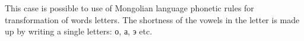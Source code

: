 \documentclass[conference,a4paper]{IEEEtran}
\begin{document}
This case is possible to use of Mongolian language phonetic rules for transformation of words letters. The shortness of the vowels in the letter is made up by writing a single letters: о, а, э etc.



%
%



%
%
\end{document}
